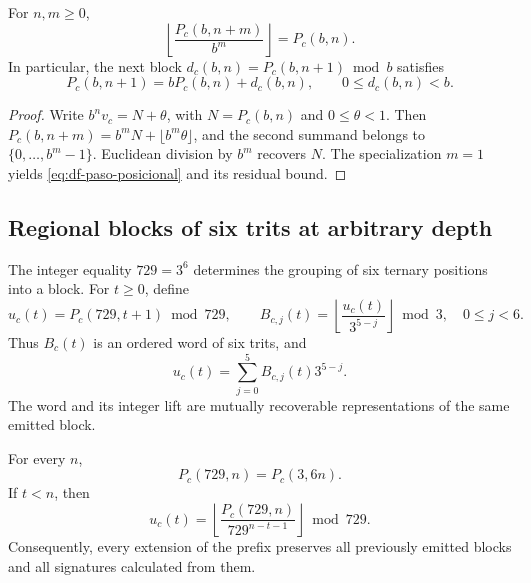 \begin{proposition}
\label{prop:df-prefijos-compatibles}
For \(n,m\geq0\),
\begin{equation}
 \left\lfloor\frac{P_c(b,n+m)}{b^m}\right\rfloor=P_c(b,n).
 \label{eq:df-truncamiento}
\end{equation}
In particular, the next block
\(d_c(b,n)=P_c(b,n+1)\bmod b\) satisfies
\begin{equation}
 P_c(b,n+1)=bP_c(b,n)+d_c(b,n),\qquad 0\leq d_c(b,n)<b.
 \label{eq:df-paso-posicional}
\end{equation}
\end{proposition}

\begin{proof}
Write \(b^n v_c=N+\theta\), with
\(N=P_c(b,n)\) and \(0\leq\theta<1\). Then
\(P_c(b,n+m)=b^mN+\lfloor b^m\theta\rfloor\), and the second summand
belongs to \(\{0,\ldots,b^m-1\}\). Euclidean division by \(b^m\)
recovers \(N\). The specialization \(m=1\) yields
\eqref{eq:df-paso-posicional} and its residual bound.
\end{proof}

\subsection{Regional blocks of six trits at arbitrary depth}
\label{subsec:df-bloques-arbitrarios}


The integer equality \(729=3^6\) determines the grouping of six ternary
positions into a block. For \(t\geq0\), define
\begin{equation}
 u_c(t)=P_c(729,t+1)\bmod729,
 \qquad
 B_{c,j}(t)=
 \left\lfloor\frac{u_c(t)}{3^{5-j}}\right\rfloor\bmod3,
 \quad 0\leq j<6.
 \label{eq:df-bloque-y-banda}
\end{equation}
Thus \(B_c(t)\) is an ordered word of six trits, and
\begin{equation}
 u_c(t)=\sum_{j=0}^{5}B_{c,j}(t)3^{5-j}.
 \label{eq:df-elevacion-banda}
\end{equation}
The word and its integer lift are mutually recoverable representations
of the same emitted block.

\begin{theorem}
\label{thm:df-bloque-estable}
For every \(n\),
\[
 P_c(729,n)=P_c(3,6n).
\]
If \(t<n\), then
\begin{equation}
 u_c(t)=
 \left\lfloor\frac{P_c(729,n)}{729^{n-t-1}}\right\rfloor\bmod729.
 \label{eq:df-bloque-prefijo-largo}
\end{equation}
Consequently, every extension of the prefix preserves all previously
emitted blocks and all signatures calculated from them.
\end{theorem}

